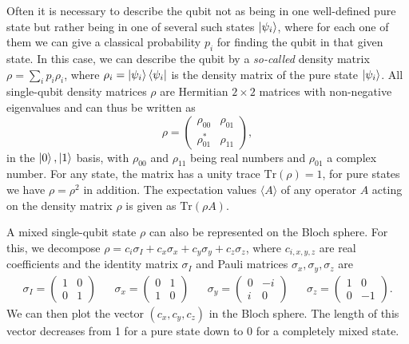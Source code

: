\smallskip

\smallskip

Often it is necessary to describe the qubit not as being in one well-defined pure state but rather being in one of several such states $\left| \psi_i \right>$, where for each one of them we can give a classical probability $p_i$ for finding the qubit in that given state. In this case, we can describe the qubit by a {\it so-called} density matrix $\rho = \sum\limits_i p_i \rho_i$, where $\rho_i=\left| \psi_{i} \right>\left< \psi_{i} \right|$ is the density matrix of the pure state $\left| \psi_i \right>$. All single-qubit density matrices $\rho$ are Hermitian $2\times 2$ matrices with non-negative eigenvalues and can thus be written as
%
\begin{equation}
\rho = \left( \begin{array}{cc} \rho_{00} & \rho_{01} \\ \rho_{01}^* & \rho_{11} \end{array} \right),
\end{equation}
%
in the ${\left| 0 \right>,\left| 1 \right>}$ basis, with $\rho_{00}$ and $\rho_{11}$ being real numbers and $\rho_{01}$ a complex number. For any state, the matrix has a unity trace $\mathrm{Tr}(\rho)=1$, for pure states we have $\rho=\rho^2$ in addition. The expectation values $\langle A \rangle$ of any operator $A$ acting on the density matrix $\rho$ is given as $\mathrm{Tr}(\rho A)$.

\smallskip

A mixed single-qubit state $\rho$ can also be represented on the Bloch sphere. For this, we decompose $\rho = c_i\sigma_I+c_x\sigma_x+c_y\sigma_y+c_z\sigma_z$, where $c_{i,x,y,z}$ are real coefficients and the identity matrix $\sigma_I$ and Pauli matrices $\sigma_x,\sigma_y,\sigma_z$ are
%
\begin{align}
  \sigma_I  =  \left( \begin{array}{cc} 1 & 0 \\ 0 & 1 \end{array} \right)
 & &  \sigma_x  =  \left( \begin{array}{cc} 0 & 1 \\ 1 & 0 \end{array} \right)
  & & \sigma_y  =  \left( \begin{array}{cc} 0 & -i \\ i  &  0\end{array} \right)
  & & \sigma_z  =  \left( \begin{array}{cc} 1 & 0 \\ 0 & -1 \end{array} \right).
\label{eq:pauli_operators}
\end{align}
% 
We can then plot the vector $(c_x,c_y,c_z)$ in the Bloch sphere. The length of this vector decreases from 1 for a pure state down to 0 for a completely mixed state.

